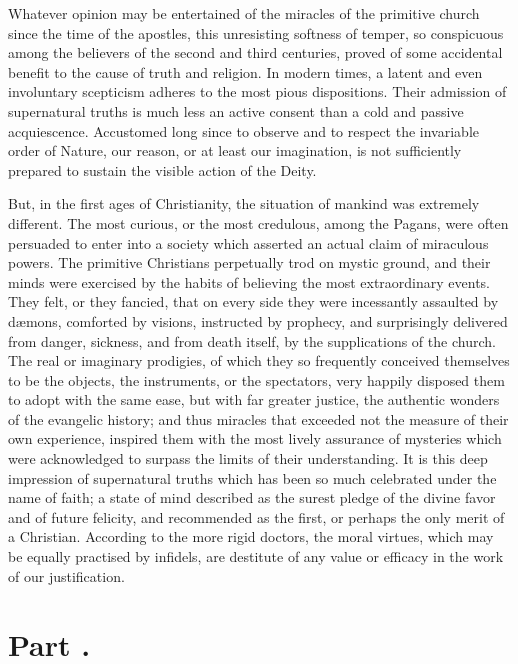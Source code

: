 Whatever opinion may be entertained of the miracles of the
primitive church since the time of the apostles, this unresisting
softness of temper, so conspicuous among the believers of the
second and third centuries, proved of some accidental benefit to
the cause of truth and religion. In modern times, a latent and
even involuntary scepticism adheres to the most pious
dispositions. Their admission of supernatural truths is much less
an active consent than a cold and passive acquiescence.
Accustomed long since to observe and to respect the invariable
order of Nature, our reason, or at least our imagination, is not
sufficiently prepared to sustain the visible action of the Deity.

But, in the first ages of Christianity, the situation of mankind
was extremely different. The most curious, or the most credulous,
among the Pagans, were often persuaded to enter into a society
which asserted an actual claim of miraculous powers. The
primitive Christians perpetually trod on mystic ground, and their
minds were exercised by the habits of believing the most
extraordinary events. They felt, or they fancied, that on every
side they were incessantly assaulted by dæmons, comforted by
visions, instructed by prophecy, and surprisingly delivered from
danger, sickness, and from death itself, by the supplications of
the church. The real or imaginary prodigies, of which they so
frequently conceived themselves to be the objects, the
instruments, or the spectators, very happily disposed them to
adopt with the same ease, but with far greater justice, the
authentic wonders of the evangelic history; and thus miracles
that exceeded not the measure of their own experience, inspired
them with the most lively assurance of mysteries which were
acknowledged to surpass the limits of their understanding. It is
this deep impression of supernatural truths which has been so
much celebrated under the name of faith; a state of mind
described as the surest pledge of the divine favor and of future
felicity, and recommended as the first, or perhaps the only merit
of a Christian. According to the more rigid doctors, the moral
virtues, which may be equally practised by infidels, are
destitute of any value or efficacy in the work of our
justification.

\section{Part \thesection.}

